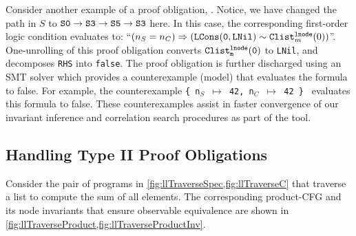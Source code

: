 Consider another example of a proof obligation,
.
Notice, we have changed the path in $S$ to ${\tt S0\rightarrow S3\rightarrow S5\rightarrow S3}$ here.
In this case, the corresponding first-order logic condition evaluates
to: ``$(n_S=n_C)\Rightarrow({\tt LCons(0, LNil)}\sim{}{\tt Clist}^{{\tt lnode}}_{m}(0))$''.
One-unrolling of this proof obligation converts
${\tt Clist^{{\tt lnode}}_{m}(0)}$ to {\tt LNil}, and
decomposes {\tt RHS} into {\tt false}.
The proof obligation is further discharged using an SMT solver
which provides a counterexample (model) that evaluates the
formula to false. For example, the counterexample {\tt \{ n$_S$ $\mapsto$ 42, n$_C$ $\mapsto$ 42 \} }
evaluates this formula to false.
These counterexamples
assist in faster convergence
of our invariant inference and correlation search procedures as part of the \toolName{} tool.



\subsection{Handling Type II Proof Obligations}
\label{sec:syn-cat2}
Consider the pair of programs in \cref{fig:llTraverseSpec,fig:llTraverseC}
that traverse a list to compute the sum of all elements.
The corresponding product-CFG and its node
invariants that ensure observable
equivalence are shown in \cref{fig:llTraverseProduct,fig:llTraverseProductInv}.


